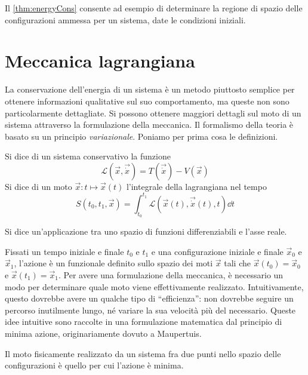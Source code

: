 Il \autoref{thm:energyCons} consente ad esempio di determinare la regione di spazio delle configurazioni ammessa per un sistema, date le condizioni iniziali.

\section{Meccanica lagrangiana}
La conservazione dell'energia di un sistema è un metodo piuttosto semplice per ottenere informazioni qualitative sul suo comportamento, ma queste non sono particolarmente dettagliate. Si possono ottenere maggiori dettagli sul moto di un sistema attraverso la formulazione  della meccanica. Il formalismo della teoria è basato su un principio \emph{variazionale}. Poniamo per prima cosa le definizioni.

\begin{definition}
  Si dice  di un sistema conservativo la funzione \begin{equation}
  \mathcal{L}(\vec{x},\vec{\dot{x}}) = T(\vec{\dot{x}}) - V(\vec{x})
  \end{equation} 
  Si dice  di un moto $\vec{x}:t\mapsto \vec{x}(t)$ l'integrale della lagrangiana nel tempo \begin{equation} \label{eq:action}
  S(t_0,t_1, \vec{x}) = \int_{t_0}^{t_1} \mathcal{L}(\vec{x}(t),\vec{\dot{x}}(t),t) \dd{t}
  \end{equation}
\end{definition}
\begin{definition}
  Si dice  un'applicazione tra uno spazio di funzioni differenziabili e l'asse reale.
\end{definition}
Fissati un tempo iniziale e finale $t_0$ e $t_1$ e una configurazione iniziale e finale $\vec{x}_0$ e $\vec{x}_1$, l'azione è un funzionale definito sullo spazio dei moti $\vec{x}$ tali che $\vec{x}(t_0) = \vec{x}_0$ e $\vec{x}(t_1)=\vec{x}_1$. Per avere una formulazione della meccanica, è necessario un modo per determinare quale moto viene effettivamente realizzato. Intuitivamente, questo dovrebbe avere un qualche tipo di \textquotedblleft efficienza\textquotedblright: non dovrebbe seguire un percorso inutilmente lungo, né variare la sua velocità più del necessario. Queste idee intuitive sono raccolte in una formulazione matematica dal principio di minima azione, originariamente dovuto a Maupertuis.
\begin{minaction}
Il moto fisicamente realizzato da un sistema fra due punti nello spazio delle configurazioni è quello per cui l'azione è minima.
\end{minaction}
